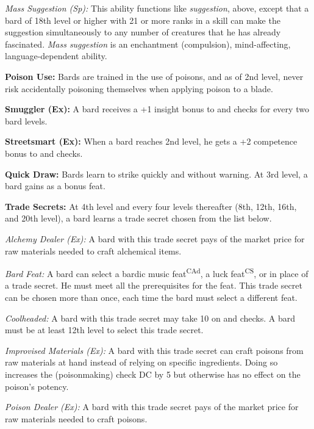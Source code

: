 \textit{Mass Suggestion (Sp):} This ability functions like \emph{suggestion}, above, except that a bard of 18th level or higher with 21 or more ranks in a  skill can make the suggestion simultaneously to any number of creatures that he has already fascinated. \emph{Mass suggestion} is an enchantment (compulsion), mind-affecting, language-dependent ability.

\textbf{Poison Use:} Bards are trained in the use of poisons, and as of 2nd level, never risk accidentally poisoning themselves when applying poison to a blade.

\textbf{Smuggler (Ex):} A bard receives a +1 insight bonus to  and  checks for every two bard levels.

\textbf{Streetsmart (Ex):} When a bard reaches 2nd level, he gets a +2 competence bonus to  and  checks.

\textbf{Quick Draw:} Bards learn to strike quickly and without warning. At 3rd level, a bard gains  as a bonus feat.

\textbf{Trade Secrets:} At 4th level and every four levels thereafter (8th, 12th, 16th, and 20th level), a bard learns a trade secret chosen from the list below.

\textit{Alchemy Dealer (Ex):} A bard with this trade secret pays \onehalf of the market price for raw materials needed to craft alchemical items.

\textit{Bard Feat:} A bard can select a bardic music feat\textsuperscript{CAd}, a luck feat\textsuperscript{CS}, or  in place of a trade secret.  He must meet all the prerequisites for the feat. This trade secret can be chosen more than once, each time the bard must select a different feat.

\textit{Coolheaded:} A bard with this trade secret may take 10 on  and  checks. A bard must be at least 12th level to select this trade secret.

\textit{Improvised Materials (Ex):} A bard with this trade secret can craft poisons from raw materials at hand instead of relying on specific ingredients. Doing so increases the  (poisonmaking) check DC by 5 but otherwise has no effect on the poison's potency.

\textit{Poison Dealer (Ex):} A bard with this trade secret pays \onehalf of the market price for raw materials needed to craft poisons.


